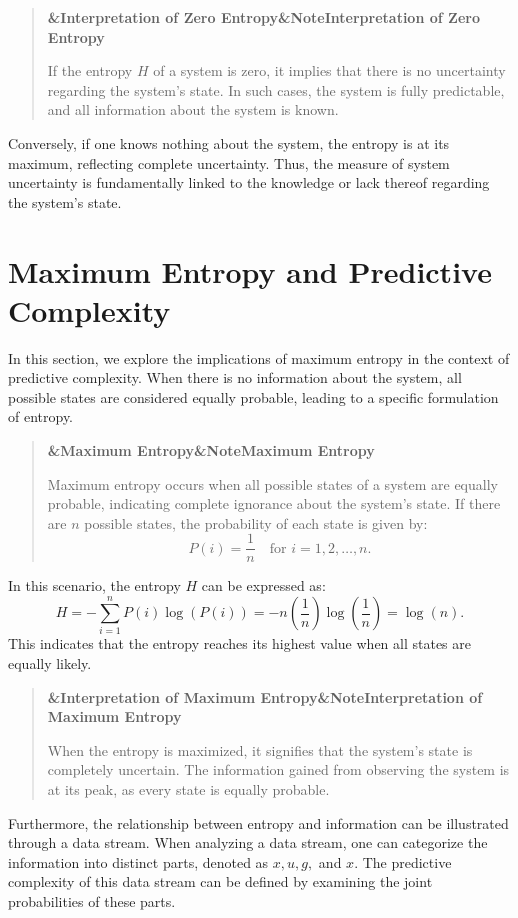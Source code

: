 \documentclass[a4paper]{article}
\newcommand{\boxheading}[1]{%
  \par\smallskip
  \noindent\textbf{\ifx&#1&Note\else#1\fi}\par
  \smallskip
}
\newenvironment{defbox}[1][]{%
  \begin{quote}\color{green!40!black}\boxheading{#1}\normalcolor
}{\end{quote}}
\newenvironment{rembox}[1][]{%
  \begin{quote}\color{black!70}\boxheading{#1}\normalcolor
}{\end{quote}}
\begin{document}
\begin{rembox}[Interpretation of Zero Entropy]
If the entropy \( H \) of a system is zero, it implies that there is no uncertainty regarding the system's state. In such cases, the system is fully predictable, and all information about the system is known.
\end{rembox}

Conversely, if one knows nothing about the system, the entropy is at its maximum, reflecting complete uncertainty. Thus, the measure of system uncertainty is fundamentally linked to the knowledge or lack thereof regarding the system's state.

\section{Maximum Entropy and Predictive Complexity}
In this section, we explore the implications of maximum entropy in the context of predictive complexity. When there is no information about the system, all possible states are considered equally probable, leading to a specific formulation of entropy.

\begin{defbox}[Maximum Entropy]
Maximum entropy occurs when all possible states of a system are equally probable, indicating complete ignorance about the system's state. If there are \( n \) possible states, the probability of each state is given by:
\[
P(i) = \frac{1}{n} \quad \text{for } i = 1, 2, \ldots, n.
\]
\end{defbox}

In this scenario, the entropy \( H \) can be expressed as:
\begin{equation}
H = -\sum_{i=1}^{n} P(i) \log(P(i)) = -n \left(\frac{1}{n}\right) \log\left(\frac{1}{n}\right) = \log(n).
\end{equation}
This indicates that the entropy reaches its highest value when all states are equally likely.

\begin{rembox}[Interpretation of Maximum Entropy]
When the entropy is maximized, it signifies that the system's state is completely uncertain. The information gained from observing the system is at its peak, as every state is equally probable.
\end{rembox}

Furthermore, the relationship between entropy and information can be illustrated through a data stream. When analyzing a data stream, one can categorize the information into distinct parts, denoted as \( x, u, g, \) and \( x \). The predictive complexity of this data stream can be defined by examining the joint probabilities of these parts.
\end{document}
